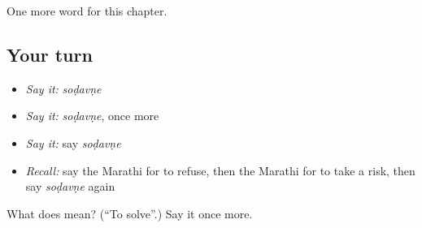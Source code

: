 \begin{grammarlens}[title={What you've built}]
One more word for this chapter.
\end{grammarlens}

\subsection*{Your turn}
\begin{itemize}
\raggedright
  \item \emph{Say it:} \emph{soḍavṇe}
  \item \emph{Say it:} \emph{soḍavṇe}, once more
  \item \emph{Say it:} say \emph{soḍavṇe}
  \item \emph{Recall:} say the Marathi for to refuse, then the Marathi for to take a risk, then say \emph{soḍavṇe} again
\end{itemize}

\begin{tcolorbox}[breakable,colback=teal!4,colframe=teal!35!black,title={Before you move on}]
What does  mean? (\textquotedblleft{}To solve\textquotedblright{}.) Say it once more.
\end{tcolorbox}
